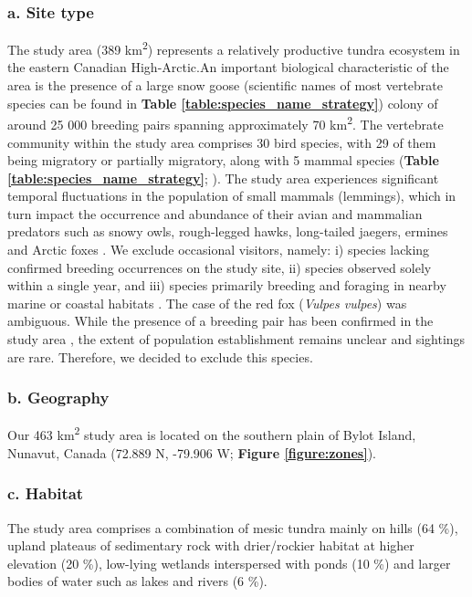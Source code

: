 \documentclass[a4paper,twoside,10pt]{article}
\begin{document}
 			\subsubsection*{a. Site type}
  The study area (389 km\textsuperscript{2}) represents a relatively productive tundra ecosystem in the eastern Canadian High-Arctic.An important biological characteristic of the area is the presence of a large snow goose (scientific names of most vertebrate species can be found in \textbf{Table \ref{table:species_name_strategy}}) colony of around 25 000 breeding pairs \citep{reed2002} spanning approximately 70 km\textsuperscript{2}. The vertebrate community within the study area comprises 30 bird species, with 29 of them being migratory or partially migratory, along with 5 mammal species (\textbf{Table \ref{table:species_name_strategy}}; \citet{moisan2023, gauthier2024a}). The study area experiences significant temporal fluctuations in the population of small mammals (lemmings), which in turn impact the occurrence and abundance of their avian and mammalian predators such as snowy owls, rough-legged hawks, long-tailed jaegers, ermines and Arctic foxes \citep{legagneux2012}. We exclude occasional visitors, namely: i) species lacking confirmed breeding occurrences on the study site, ii) species observed solely within a single year, and iii) species primarily breeding and foraging in nearby marine or coastal habitats \citep{moisan2023}. The case of the red fox (\textit{Vulpes vulpes}) was ambiguous. While the presence of a breeding pair has been confirmed in the study area \citep{lai2022}, the extent of population establishment remains unclear and sightings are rare. Therefore, we decided to exclude this species.

         		
\newpage
            	\subsubsection*{b. Geography} Our 463 km\textsuperscript{2} study area is located on the southern plain of Bylot Island, Nunavut, Canada (72.889 N, -79.906 W; \textbf{Figure \ref{figure:zones}}).
            	\subsubsection*{c. Habitat}  The study area comprises a combination of mesic tundra mainly on hills (64 \%), upland plateaus of sedimentary rock with drier/rockier habitat at higher elevation (20 \%), low-lying wetlands interspersed with ponds (10 \%) and larger bodies of water such as lakes and rivers (6 \%).
\end{document}

